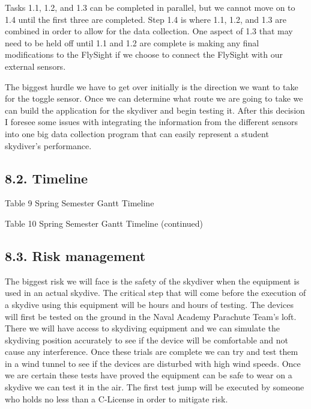 \documentclass[10pt]{article}
\begin{document}



Tasks 1.1, 1.2, and 1.3 can be completed in parallel, but we cannot move on to 1.4 until the first three are completed. Step 1.4 is where 1.1, 1.2, and 1.3 are combined in order to allow for the data collection. One aspect of 1.3 that may need to be held off until 1.1 and 1.2 are complete is making any final modifications to the FlySight if we choose to connect the FlySight with our external sensors.



The biggest hurdle we have to get over initially is the direction we want to take for the toggle sensor. Once we can determine what route we are going to take we can build the application for the skydiver and begin testing it. After this decision I foresee some issues with integrating the information from the different sensors into one big data collection program that can easily represent a student skydiver’s performance.



\subsection{8.2. Timeline}

Table 9 Spring Semester Gantt Timeline

Table 10 Spring Semester Gantt Timeline (continued)



\subsection{8.3. Risk management}

The biggest risk we will face is the safety of the skydiver when the equipment is used in an actual skydive. The critical step that will come before the execution of a skydive using this equipment will be hours and hours of testing. The devices will first be tested on the ground in the Naval Academy Parachute Team’s loft. There we will have access to skydiving equipment and we can simulate the skydiving position accurately to see if the device will be comfortable and not cause any interference. Once these trials are complete we can try and test them in a wind tunnel to see if the devices are disturbed with high wind speeds. Once we are certain these tests have proved the equipment can be safe to wear on a skydive we can test it in the air. The first test jump will be executed by someone who holds no less than a C-License in order to mitigate risk.
\end{document}
